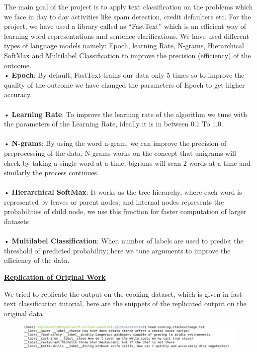 \documentclass[a4paper,1pt]{article}
\begin{document}
 \noindent The main goal of the project is to apply text classification on the problems which we face in day to day activities like spam detection, credit defaulters etc. For the project, we have used a library called as “FastText” which is an efficient way of learning word representations and sentence clarifications. We have used different types of language models namely: Epoch, learning Rate, N-grams, Hierarchical SoftMax and Multilabel Classification to improve the precision (efficiency) of the outcome.\bigskip
	\\•	\textbf{Epoch}:  By default, FastText trains our data only 5 times so to improve the quality of the outcome we have changed the parameters of Epoch to get higher accuracy.\\
	\\•	\textbf{Learning Rate}: To improve the learning rate of the algorithm we tune with the parameters of the Learning Rate, ideally it is in between 0.1 To 1.0.\\
	\\•	\textbf{N-grams}: By using the word n-gram, we can improve the precision of preprocessing of the data. N-grams works on the concept that unigrams will check by taking a single word at a time, bigrams will scan 2 words at a time and similarly the process continues.\\
	\\•	\textbf{Hierarchical SoftMax}: It works as the tree hierarchy, where each word is represented by leaves or parent nodes; and internal nodes represents the probabilities of child node, we use this function for faster computation of larger datasets \\
	\\•	\textbf{Multilabel Classification}: When number of labels are used to predict the threshold of predicted probability; here we tune arguments to improve the efficiency of the data.

\begin{center}
	\textbf{\underline {Replication of Original Work}}
\end{center}

 
\noindent We tried to replicate the output on the cooking dataset, which is given in fast text classification tutorial, here are the snippets of the replicated output on the original data\\

\begin{figure}[h]
	\centering
	\includegraphics[width=1.0\linewidth]{"Precision and Recall at position 9"}
	\caption{}
	\label{fig:precision-and-recall-at-position-9}
\end{figure}
\end{document}
